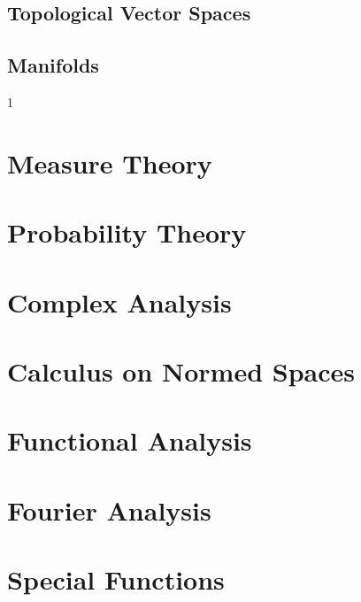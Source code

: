 \documentclass{book}                                                           %
\def\compileanalysis{0}
\begin{document}
                \chapter{Topological Vector Spaces}
                \chapter{Manifolds}
        \clearpage
        \setcounter{endpage}{\thepage}
    \fi

    \if\compileanalysis1
            \label{book:Analysis}%
            \renewcommand{\PATH}{\TOPPATH/Analysis}
            \setcounter{page}{\value{endpage}}
            \part{Measure Theory}
                
            \part{Probability Theory}
                
            \part{Complex Analysis}
                
            \part{Calculus on Normed Spaces}
                
            \part{Functional Analysis}
                
            \part{Fourier Analysis}
                
                
            \part{Special Functions}
                
                
        \clearpage
        \setcounter{endpage}{\thepage}
    \fi
\end{document}
